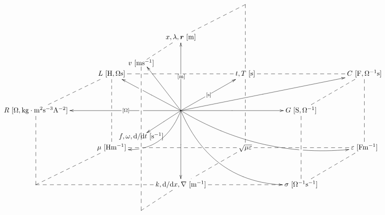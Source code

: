 \documentclass[a4j,10pt]{jarticle}
\makeatletter
\def\const{\mathrm{const}}
\def\uni#1{[\unit{#1}]}
\def\cell#1#2{#1\,\uni{#2}}
\def\dotted#1{\ar@{--}[#1]}
\def\r{\bm r}
\makeatother
\begin{document}
\def\cell#1#2{#1\,\unit{[#2]}}
\def\uni#1{}
\vspace{-10mm}
\def\tom{\ar@{->}[uu]|-{\unit{[m]}}}
\def\tos{\ar@{->}[ur]|-{\unit{[s]}}}
\def\toO{\ar@{->}[ll]|!{[]+(-20,-13);[]+(-20,13)}\hole|-{\unit{[O]}}}
\def\tomm{\ar[dd]|-{\uni{m^{-1}}}}
\def\toms{\ar@{->}+(-20,-13)*{\cell{f,\omega, \dd/\dd t}{s^{-1}}}|-{\uni{s^{-1}}}}
\def\tomO{\ar[rr]|-{\uni{O^{-1}}}}
\def\arrr{\dotted{rr}}
\def\ardd{\dotted{dd}}
\def\arddsplit{\dotted{dd}|!{[ld];[rr]}\hole|!{[ld];[rd]}\hole}
\def\aruu{\dotted{uu}}
\def\arll{\dotted{ll}}
\def\arllsplit{\dotted{ll}|!{[ld];[lu]}\hole}
\def\arllsplitp{\dotted{ll}|!{[]+(-20,-13);[]+(-20,13)}\hole}
\def\arrrsplit{\dotted{rr}|!{[rd];[ru]+(-20,-13)}\hole|!{[rd];[ru]}\hole}
\def\ard{\dotted{d}}
\def\arur{\dotted{ur}}
\def\ardr{\dotted{dr}}
\def\ardl{\dotted{dl} |!{+(-8,-30);+(-8,30)}\hole}
\def\arrowzp{\ar@/^2pc/[dl]|-(0.4){\uni{Hm^{-1}}}|!{[]+(-20,-13);[]+(-20,13)}\hole}
\def\arrowzzp{\ar@/_2pc/[rrrd]|-(0.25){\uni{Fm^{-1}}}|!{[rr];[rrdd]}\hole }
\def\tolv{\ar@{--}'+(-20,-13)*{\cell{v}{m s^{-1}}}'[dd]+(-20,-13)}
\def\tov{\ar@{->}[uu]+(-20,-13)+(3,-2)}
\def\toL{\ar@{->}[ul]|-{\uni{H,Os}}|!{+(-12,-12);+(-12,12)}\hole}
\def\toC{\ar@{->}[urrr]|-{\uni{F,O^{-1}s}}}
\def\arrowyyp{\ar@/_3pc/@{->}[rrdd]|-(0.7){\uni{O^{-1}m^{-1}}}}
\def\tof{\ar@{--}'+(-20,-13)'[uu]+(-20,-13) |!{+(-10,-8);+(10,-8)}\hole}
\def\toT{\ar@{--}'[ur]'[dr]}
\[\xymatrix@=0.50in{
  &&*=0{}& *=0{} &\\
      &      & \cell{x, \lambda,\r}{m} \tolv \toT &      &      &      & \\
      &      \cell{L}{H,Os} \arrrsplit\arddsplit      &      & \cell{t,T}{s}\arrr\arddsplit      &      & \cell{C}{F,O^{-1}s} \ardd      &      \\
 \cell{R}{O,kg\cdot m^2 s^{-3} A^{-2}}\ardd\arur      &      & *=0{}\arrowyyp\toL\toC\tov\tom\tos\toO\tomO\tomm\toms \arrowzzp \arrowzp      &      & \cell{G}{S,\Omega^{-1}}\arur\ardd      &      & \\
      &      \cell{\mu}{Hm^{-1}}      &      & \sqrt{\mu\varepsilon}\ardl\arll      &      & \cell{\varepsilon}{Fm^{-1}} \arllsplit      &      \\
 *=0{} \arur      &      & \cell{k,\dd/\dd x, \nabla}{m^{-1}} \arllsplitp\tof      &      & \cell{\sigma}{O^{-1}s^{-1}}\arll\arur      &      & \\
 }\]
\vspace{20mm}
\def\const{\mathrm{const}}
\def\uni#1{[\unit{#1}]}
\end{document}
